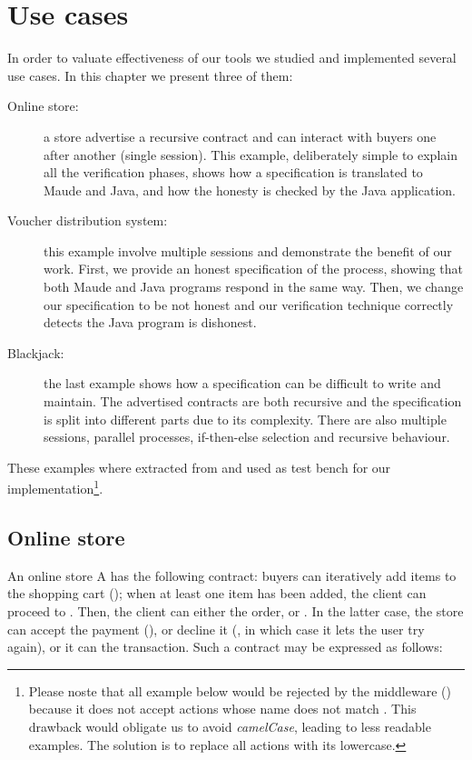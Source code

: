 \chapter{Use cases}\label{chap:use-cases}

In order to valuate effectiveness of our tools we studied and implemented several use cases. In this chapter we present three of them:

\begin{description}
	\item[Online store:] a store advertise a recursive contract and can interact with buyers one after another (single session). This example, deliberately simple to explain all the verification phases, shows how a \coco specification is translated to Maude and Java, and how the honesty is checked by the Java application.
	
	\item[Voucher distribution system:] this example involve multiple sessions and demonstrate the benefit of our work. First, we provide an honest specification of the process, showing that both Maude and Java programs respond in the same way. Then, we change our specification to be not honest and our verification technique correctly detects the Java program is dishonest.
	
	\item[Blackjack:] the last example shows how a specification can be difficult to write and maintain. The advertised contracts are both recursive and the specification is split into different parts due to its complexity. There are also multiple sessions, parallel processes, if-then-else selection and recursive behaviour.
\end{description}

These examples where extracted from \cite{verifiable} and used as test bench for our implementation\footnote{Please noste that all example below would be rejected by the \coco middleware () because it does not accept actions whose name does not match \incode{[a-z]+}. This drawback would obligate us to avoid \textit{camelCase}, leading to less readable examples. The solution is to replace all actions with its lowercase.}.

\section{Online store}\label{ex:online-store}
An online store {\pmv A} has the following contract: %
buyers can iteratively add items to the shopping cart ();
when at least one item has been added,
the client can proceed to .
Then, the client can either  the order, 
or .
In the latter case,
the store can accept the payment (),
or decline it (, in which case it lets the user try again),
or it can  the transaction.
%
Such a contract may be expressed as follows:

